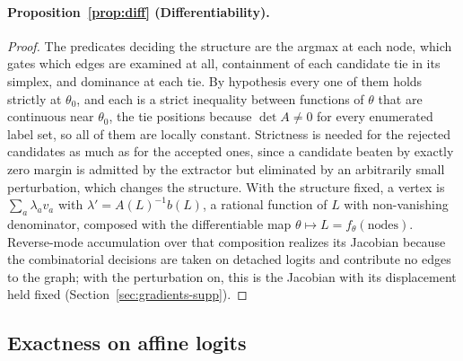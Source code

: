 \documentclass[11pt]{article}
\theoremstyle{definition}
\begin{document}
\paragraph*{Proposition~\ref{prop:diff} (Differentiability).}
\begin{proof}
The predicates deciding the structure are the argmax at each node, which gates
which edges are examined at all, containment of each candidate tie in its
simplex, and dominance at each tie. By hypothesis every one of them holds
strictly at $\theta_0$, and each is a strict inequality between functions of
$\theta$ that are continuous near $\theta_0$, the tie positions because
$\det A \neq 0$ for every enumerated label set, so all of them are locally
constant. Strictness is
needed for the rejected candidates as much as for the accepted ones, since a
candidate beaten by exactly zero margin is admitted by the extractor but
eliminated by an arbitrarily small perturbation, which changes the structure.
With the
structure fixed, a vertex is $\sum_a \lambda_a v_a$ with
$\lambda' = A(L)^{-1}b(L)$, a rational function of $L$ with non-vanishing
denominator, composed with the differentiable map
$\theta \mapsto L = f_\theta(\text{nodes})$. Reverse-mode accumulation over
that composition realizes its Jacobian because the combinatorial decisions are
taken on detached logits and contribute no edges to the graph; with the
perturbation on, this is the Jacobian with its displacement held fixed
(Section~\ref{sec:gradients-supp}).
\end{proof}

\subsection{Exactness on affine logits}
\label{sec:proofs-affine}
\end{document}
